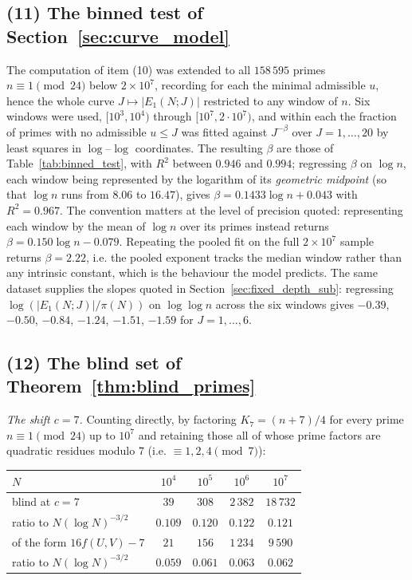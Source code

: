 \documentclass[11pt, a4paper]{article}
\theoremstyle{plain}
\theoremstyle{definition}
\begin{document}
\subsection*{(11) The binned test of Section~\ref{sec:curve_model}}
The computation of item (10) was extended to all $158\,595$ primes $n\equiv1\pmod{24}$ below $2\times10^{7}$, recording for each the minimal admissible $u$, hence the whole curve $J\mapsto|E_1(N;J)|$ restricted to any window of $n$. Six windows were used, $[10^{3},10^{4})$ through $[10^{7},2\cdot10^{7})$, and within each the fraction of primes with no admissible $u\le J$ was fitted against $J^{-\beta}$ over $J=1,\dots,20$ by least squares in $\log$--$\log$ coordinates. The resulting $\beta$ are those of Table~\ref{tab:binned_test}, with $R^{2}$ between $0.946$ and $0.994$; regressing $\beta$ on $\log n$, each window being represented by the logarithm of its \emph{geometric midpoint} (so that $\log n$ runs from $8.06$ to $16.47$), gives $\beta=0.1433\log n+0.043$ with $R^{2}=0.967$. The convention matters at the level of precision quoted: representing each window by the mean of $\log n$ over its primes instead returns $\beta=0.150\log n-0.079$. Repeating the pooled fit on the full $2\times10^{7}$ sample returns $\beta=2.22$, i.e. the pooled exponent tracks the median window rather than any intrinsic constant, which is the behaviour the model predicts. The same dataset supplies the slopes quoted in Section~\ref{sec:fixed_depth_sub}: regressing $\log(|E_1(N;J)|/\pi(N))$ on $\log\log n$ across the six windows gives $-0.39$, $-0.50$, $-0.84$, $-1.24$, $-1.51$, $-1.59$ for $J=1,\dots,6$.

\subsection*{(12) The blind set of Theorem~\ref{thm:blind_primes}}
\emph{The shift $c=7$.} Counting directly, by factoring $K_7=(n+7)/4$ for every prime $n\equiv1\pmod{24}$ up to $10^{7}$ and retaining those all of whose prime factors are quadratic residues modulo $7$ (i.e. $\equiv1,2,4\pmod 7$):

\begin{center}
\begin{tabular}{lcccc}
\toprule
$N$ & $10^{4}$ & $10^{5}$ & $10^{6}$ & $10^{7}$\\
\midrule
blind at $c=7$ & $39$ & $308$ & $2\,382$ & $18\,732$\\
ratio to $N(\log N)^{-3/2}$ & $0.109$ & $0.120$ & $0.122$ & $0.121$\\
\midrule
of the form $16f(U,V)-7$ & $21$ & $156$ & $1\,234$ & $9\,590$\\
ratio to $N(\log N)^{-3/2}$ & $0.059$ & $0.061$ & $0.063$ & $0.062$\\
\bottomrule
\end{tabular}
\end{center}
\end{document}
